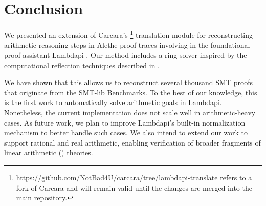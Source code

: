 \documentclass[runningheads,envcountsame]{llncs}
\begin{document}
\section{Conclusion}
\label{sec:conclusion}

We presented an extension of Carcara's \cite{carcara}\footnote{\url{https://github.com/NotBad4U/carcara/tree/lambdapi-translate} refers to a fork of Carcara and will remain valid until the changes are merged into the main repository.} translation module \cite{ColtellacciMD24} for reconstructing arithmetic reasoning steps in Alethe proof traces involving  in the foundational proof assistant Lambdapi \cite{lambdapi}.
Our method includes a ring solver inspired by the computational reflection techniques described in \cite{reflection-origin-coq,ring-coq}.

We have shown that this allows us to reconstruct several thousand SMT proofs that originate from the SMT-lib Benchmarks.
To the best of our knowledge, this is the first work to automatically solve arithmetic goals in Lambdapi.
Nonetheless, the current implementation does not  scale well in arithmetic-heavy cases.
As future work, we plan to improve Lambdapi's built-in normalization mechanism to better handle such cases.
We also intend to extend our work to support rational and real arithmetic, enabling verification of broader fragments of linear arithmetic () theories.





\end{document}
